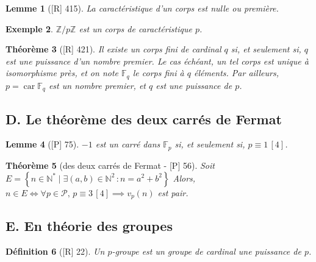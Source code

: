 \documentclass[10pt, a4paper, parskip=full, twoside, twocolumn]{report}
\newtheorem{definition}{Définition}
\newtheorem{theorem}[definition]{Théorème}
\newtheorem{lemma}[definition]{Lemme}
\newtheorem{example}[definition]{Exemple}
\newcommand{\IN}{\mathbb{N}}
\newcommand{\IZpZ}{\mathbb{Z}/p\mathbb{Z}}
\newcommand{\IF}{\mathbb{F}}
\DeclareMathOperator{\car}{car}
\begin{document}
\begin{lemma}[\textnormal{[R] 415}]
	La caractéristique d'un corps est nulle ou première.
\end{lemma}

\begin{example}
	$\IZpZ$ est un corps de caractéristique $p$.
\end{example}

\begin{theorem}[\textnormal{[R] 421}]
	Il existe un corps fini de cardinal $q$ si, et seulement si, $q$ est une puissance d'un nombre premier. 
	Le cas échéant, un tel corps est unique à isomorphisme près, et on note $\IF_q$ le corps fini à $q$ éléments.
	Par ailleurs, $p = \car \IF_q$ est un nombre premier, et $q$ est une puissance de $p$.
\end{theorem}

\subsection*{D. Le théorème des deux carrés de Fermat}

\begin{tcolorbox}[
    breakable, %
    colback=developpement, %
    colframe=gray!0!black, %
    boxrule=0pt, %
    arc=1mm, %
	boxsep=0pt,
	left=0pt, right=0pt, top=0pt, bottom=0pt
]
\begin{lemma}[\textnormal{[P] 75}]
	\label{121dev11}
	$-1$ est un carré dans $\IF_p$ si, et seulement si, $p\equiv 1\,[4]$.
\end{lemma}

\begin{theorem}[des deux carrés de Fermat - \textnormal{[P] 56}]
	\label{121dev12}
	Soit $E = \left\{n\in\IN^* \mid \exists (a,b)\in\IN^2\,\colon n = a^2 + b^2 \right\}$
	Alors, $n\in E \iff \forall p\in\mathcal{P},\, p\equiv 3\,[4] \implies v_p(n)$ est pair.
\end{theorem}
\end{tcolorbox}

\subsection*{E. En théorie des groupes}
\begin{definition}[\textnormal{[R] 22}]
	Un $p$-groupe est un groupe de cardinal une puissance de $p$.
\end{definition}
\end{document}

